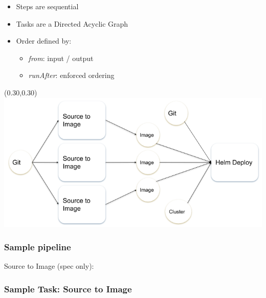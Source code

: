 \documentclass[aspectratio=169,11pt,hyperref={colorlinks=true}]{beamer}
\begin{document}
\begin{lblackrwhiteframe}
\begin{blackframe}
\begin{2columnsframe}
  {
    \begin{itemize}
      \item Steps are sequential
      \item Tasks are a Directed Acyclic Graph
      \item Order defined by:
      \begin{itemize}
        \item {\em from}: input / output
        \item {\em runAfter}: enforced ordering
      \end{itemize}
    \end{itemize}
  }
  {
  \begin{textblock*}{0.65\paperwidth}(0.30\paperwidth,0.30\paperheight)
    \centering
    \includegraphics[width=0.65\paperwidth]{img/pipeline.png}
  \end{textblock*}
  }
  \frametitle{Sample pipeline}
\end{2columnsframe}

\begin{2columnsframe}
  {
  {\tiny Source to Image (spec only): \\}
  
  }
  {
  
  }
  \frametitle{Sample Task: Source to Image}
\end{2columnsframe}


\end{blackframe}
\end{lblackrwhiteframe}
\end{document}
